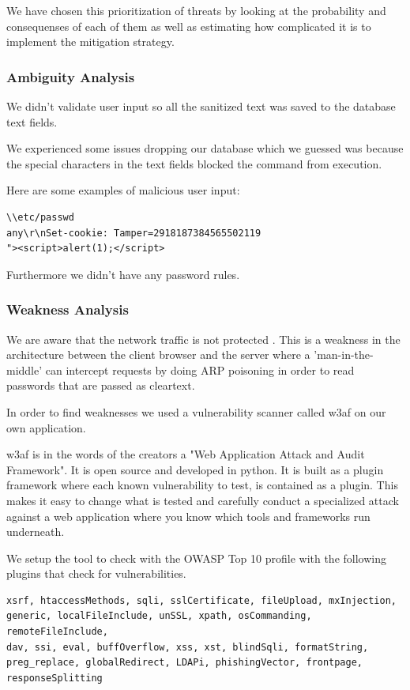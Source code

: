 \documentclass[a4paper]{article}
\begin{document}
We have chosen this prioritization of threats by looking at the probability and consequenses of each of them as well as estimating how complicated it is to implement the mitigation strategy.



\subsubsection{Ambiguity Analysis}

We didn't validate user input so all the sanitized text was saved to the database text fields. 

We experienced some issues dropping our database which we guessed was because the special characters in the text fields blocked the command from execution.

Here are some examples of malicious user input:
\begin{verbatim}
\\etc/passwd
any\r\nSet-cookie: Tamper=2918187384565502119
"><script>alert(1);</script>
\end{verbatim}

Furthermore we didn't have any password rules.

\subsubsection{Weakness Analysis}
We are aware that the network traffic is not protected \cite{sins2009}. This is a weakness in the architecture between the client browser and the server where a 'man-in-the-middle' can intercept requests by doing ARP poisoning in order to read passwords that are passed as cleartext.

In order to find weaknesses we used a vulnerability scanner called w3af on our own application.


w3af is in the words of the creators a "Web Application Attack and Audit Framework". It is open source and developed in python. It is built as a plugin framework where each known vulnerability to test, is contained as a plugin. This makes it easy to change what is tested and carefully conduct a specialized attack against a web application where you know which tools and frameworks run underneath.

We setup the tool to check with the OWASP Top 10 profile with the following plugins that check for vulnerabilities.

\begin{verbatim}
xsrf, htaccessMethods, sqli, sslCertificate, fileUpload, mxInjection, 
generic, localFileInclude, unSSL, xpath, osCommanding, remoteFileInclude, 
dav, ssi, eval, buffOverflow, xss, xst, blindSqli, formatString, 
preg_replace, globalRedirect, LDAPi, phishingVector, frontpage, 
responseSplitting
\end{verbatim}
     
\end{document}
